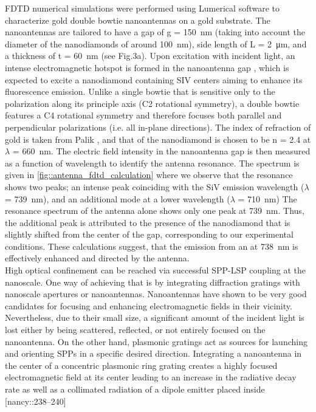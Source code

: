 	FDTD numerical simulations were performed using Lumerical software to characterize gold double bowtie nanoantennas on a gold substrate. The nanoantennas are tailored to have a gap of g = \SI{150}{nm} (taking into account the diameter of the nanodiamonds of around \SI{100}{nm}), side length of L = \SI{2}{\micro\meter}, and a thickness of t = \SI{60}{nm} (see Fig.3a). 
	Upon excitation with incident light, an intense electromagnetic hotspot is formed in the nanoantenna gap \cite{Rahbany2015}, which is expected to excite a nanodiamond containing SIV centers aiming to enhance its fluorescence emission. 
	Unlike a single bowtie that is sensitive only to the polarization along its principle axis (C2 rotational symmetry), a double bowtie features a C4 rotational symmetry and therefore focuses both parallel and perpendicular polarizations (i.e. all in-plane directions).
	The index of refraction of gold is taken from Palik \cite{}, and that of the nanodiamond is chosen to be n = 2.4 at $\lambda$ = \SI{660}{nm}. 
	The electric field intensity in the nanoantenna gap is then measured as a function of wavelength to identify the antenna resonance. 
	The spectrum is given in \cref{fig::antenna_fdtd_calculation} where we observe that the resonance shows two peaks; an intense peak coinciding with the SiV emission wavelength ($\lambda$ = \SI{739}{nm}), and an additional mode at a lower wavelength ($\lambda$ = \SI{710}{nm}) \cite{Rahbany2016}
	The resonance spectrum of the antenna alone shows only one peak at \SI{739}{nm}. 
	Thus, the additional peak is attributed to the presence of the nanodiamond that is slightly shifted from the center of the gap, corresponding to our experimental conditions.
	These calculations suggest, that the emission from an \siv at \SI{738}{nm} is effectively enhanced and directed by the antenna.
	\\
	High optical confinement can be reached via successful SPP-LSP coupling at the nanoscale. One way of achieving that is by integrating diffraction gratings with nanoscale apertures or nanoantennas. Nanoantennas have shown to be very good candidates for focusing and enhancing electromagnetic fields in their vicinity. Nevertheless, due to their small size, a significant amount of the incident light is lost either by being scattered, reflected, or not entirely focused on the nanoantenna. On the other hand, plasmonic gratings act as sources for launching and orienting SPPs in a specific desired direction. Integrating a nanoantenna in the center of a concentric plasmonic ring grating creates a highly focused electromagnetic field at its center leading to an increase in the radiative decay rate as well as a collimated radiation of a dipole emitter placed inside [nancy::238–240]
